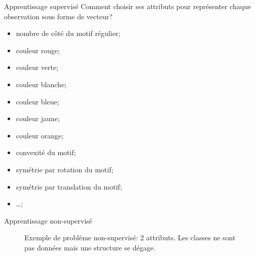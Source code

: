 \documentclass[8pt]{beamer}
\begin{document}
			\begin{frame}{Apprentissage supervisé}
				Comment choisir ses attributs pour représenter chaque observation sous forme de vecteur?
				\begin{itemize}
					\item<2-> nombre de côté du motif régulier;
					\item<3-> couleur rouge;
					\item<4-> couleur verte;
					\item<5-> couleur blanche;
					\item<6-> couleur bleue;
					\item<7-> couleur jaune;
					\item<8-> couleur orange;
					\item<9-> convexité du motif;
					\item<10-> symétrie par rotation du motif;
					\item<11-> symétrie par translation du motif;
					\item<12-> \dots;
				\end{itemize}
			\end{frame}
			\begin{frame}{Apprentissage non-supervisé}
				\begin{figure}[H]
					\begin{center}
						
						\caption*{\tiny Exemple de problème non-supervisé: 2 attributs. Les classes ne sont pas données mais une structure se dégage.}
					\end{center}
				\end{figure}
			\end{frame}
\end{document}
